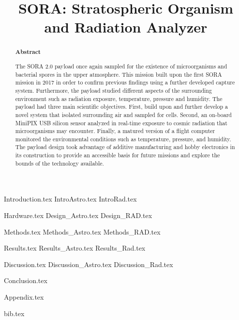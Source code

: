 \documentclass[aps,superscriptaddress,floatfix,nofootinbib,showpacs,amsmath,amssymb,altaffilletter,floatfix,onecolumn]{revtex4-1}
\begin{document}
\title{SORA: Stratospheric Organism and Radiation Analyzer}

\begin{abstract}
\begin{center}
{\bf Abstract}
\end{center}
The SORA 2.0 payload once again sampled for the existence of microorganisms and bacterial spores in the upper atmosphere.  This mission built upon the first SORA mission in 2017 \cite{SORA} in order to confirm previous findings using a further developed capture system.  Furthermore, the payload studied different aspects of the surrounding environment such as radiation exposure, temperature, pressure and humidity. The payload had three main scientific objectives. First, build upon and further develop a novel system that isolated surrounding air and sampled for cells.  Second, an on-board MiniPIX USB silicon sensor analyzed in real-time exposure to cosmic radiation that microorganisms may encounter.  Finally, a matured version of a flight computer monitored the environmental conditions such as temperature, pressure, and humidity.  The payload design took advantage of additive manufacturing and hobby electronics in its construction to provide an accessible basis for future missions and explore the bounds of the technology available. 

\newpage %
\end{abstract}

\setlength{\parindent}{1em}
\setdefaultleftmargin{1em}{1em}{}{}{}{}
\setcounter{page}{0}\thispagestyle{empty}
\maketitle
\onecolumngrid
\setcounter{tocdepth}{2}
\setcounter{page}{0}\thispagestyle{empty}
\tableofcontents
\setcounter{page}{0}\thispagestyle{empty}
\newpage
\onecolumngrid

{Introduction.tex}
{IntroAstro.tex}
{IntroRad.tex}

{Hardware.tex}
{Design_Astro.tex}
{Design_RAD.tex}

{Methods.tex}
{Methods_Astro.tex}
{Methods_RAD.tex}

{Results.tex} 
{Results_Astro.tex} 
{Results_Rad.tex} 

{Discussion.tex}
{Discussion_Astro.tex}
{Discussion_Rad.tex}

{Conclusion.tex} 
\newpage

{Appendix.tex}
\newpage

{bib.tex}%

\clearpage

\end{document}
